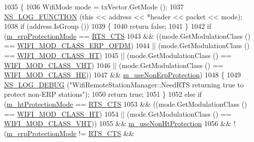 \begin{DoxyCode}
1035 \{
1036   WifiMode mode = txVector.GetMode ();
1037   \hyperlink{log-macros-disabled_8h_a90b90d5bad1f39cb1b64923ea94c0761}{NS\_LOG\_FUNCTION} (\textcolor{keyword}{this} << address << *header << packet << mode);
1038   \textcolor{keywordflow}{if} (address.IsGroup ())
1039     \{
1040       \textcolor{keywordflow}{return} \textcolor{keyword}{false};
1041     \}
1042   \textcolor{keywordflow}{if} (\hyperlink{classns3_1_1WifiRemoteStationManager_acc0e4f606a7226059ff0e2e7c74024bc}{m\_erpProtectionMode} == \hyperlink{classns3_1_1WifiRemoteStationManager_acd7d97851233efb176637f24b3f8abd6a9b13d2909729692abb397767e99edfd9}{RTS\_CTS}
1043       && ((mode.GetModulationClass () == \hyperlink{namespacens3_aa999e1221606a2b21b1eb33c2007c217afc1f5ef8d2c985f37a3224dd86ab014d}{WIFI\_MOD\_CLASS\_ERP\_OFDM})
1044           || (mode.GetModulationClass () == \hyperlink{namespacens3_aa999e1221606a2b21b1eb33c2007c217a6ac45cac36cc4454649435d24ebf349c}{WIFI\_MOD\_CLASS\_HT})
1045           || (mode.GetModulationClass () == \hyperlink{namespacens3_aa999e1221606a2b21b1eb33c2007c217a9863e4342bf5c238c74dddfc4d96c67e}{WIFI\_MOD\_CLASS\_VHT})
1046           || (mode.GetModulationClass () == \hyperlink{namespacens3_aa999e1221606a2b21b1eb33c2007c217abfa4f7272510045a9b43e8ac27ac13b0}{WIFI\_MOD\_CLASS\_HE}))
1047       && \hyperlink{classns3_1_1WifiRemoteStationManager_af5192c20c737ca1b2f054914272c89f4}{m\_useNonErpProtection})
1048     \{
1049       \hyperlink{group__logging_ga413f1886406d49f59a6a0a89b77b4d0a}{NS\_LOG\_DEBUG} (\textcolor{stringliteral}{"WifiRemoteStationManager::NeedRTS returning true to protect non-ERP
       stations"});
1050       \textcolor{keywordflow}{return} \textcolor{keyword}{true};
1051     \}
1052   \textcolor{keywordflow}{else} \textcolor{keywordflow}{if} (\hyperlink{classns3_1_1WifiRemoteStationManager_a1a4afefd1dd2f335ef6b44c3619073cd}{m\_htProtectionMode} == \hyperlink{classns3_1_1WifiRemoteStationManager_acd7d97851233efb176637f24b3f8abd6a9b13d2909729692abb397767e99edfd9}{RTS\_CTS}
1053            && ((mode.GetModulationClass () == \hyperlink{namespacens3_aa999e1221606a2b21b1eb33c2007c217a6ac45cac36cc4454649435d24ebf349c}{WIFI\_MOD\_CLASS\_HT})
1054                || (mode.GetModulationClass () == \hyperlink{namespacens3_aa999e1221606a2b21b1eb33c2007c217a9863e4342bf5c238c74dddfc4d96c67e}{WIFI\_MOD\_CLASS\_VHT}))
1055            && \hyperlink{classns3_1_1WifiRemoteStationManager_a4205e24475f15413af70fb8225044525}{m\_useNonHtProtection}
1056            && !(\hyperlink{classns3_1_1WifiRemoteStationManager_acc0e4f606a7226059ff0e2e7c74024bc}{m\_erpProtectionMode} != \hyperlink{classns3_1_1WifiRemoteStationManager_acd7d97851233efb176637f24b3f8abd6a9b13d2909729692abb397767e99edfd9}{RTS\_CTS} && 

\end{DoxyCode}
